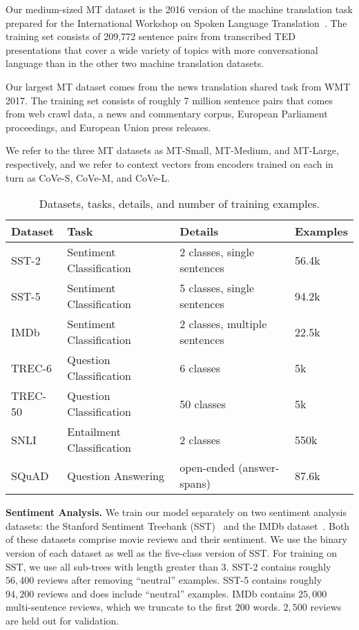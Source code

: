 \documentclass{article}
\begin{document}
Our medium-sized MT dataset is the 2016 version of the machine translation task prepared for the International Workshop on Spoken Language Translation~\citep{cettolo2015iwslt}. 
The training set consists of 209,772 sentence pairs from transcribed TED presentations that cover a wide variety of topics with more conversational language than in the other two machine translation datasets.

Our largest MT dataset comes from the news translation shared task from WMT 2017.
The training set consists of roughly 7 million sentence pairs that comes from web crawl data, a news and commentary corpus, European Parliament proceedings, and European Union press releases.

We refer to the three MT datasets as MT-Small, MT-Medium, and MT-Large, respectively,
and we refer to context vectors from encoders trained on each in turn as CoVe-S, CoVe-M, and CoVe-L.
\bigskip

\begin{table}
  \centering
\begin{tabular}{llll}
    \toprule
Dataset & Task & Details & Examples\\
\midrule
 SST-2   &Sentiment Classification & 2 classes, single sentences        & 56.4k\\
 SST-5   & Sentiment Classification & 5 classes, single sentences           &94.2k \\
 IMDb    & Sentiment Classification & 2 classes, multiple sentences          &22.5k   \\
TREC-6  & Question Classification& 6 classes & 5k  \\
  TREC-50 & Question Classification& 50 classes &5k  \\
SNLI    &Entailment Classification &  2 classes        &  550k \\
SQuAD & Question Answering & open-ended (answer-spans)  & 87.6k  \\
\bottomrule
  \end{tabular}
      \caption{Datasets, tasks, details, and number of training examples.}
      \vspace{-0.6cm}
  \label{tasks}
\end{table}

\textbf{Sentiment Analysis.} 
We train our model separately on two sentiment analysis datasets: the Stanford Sentiment Treebank (SST)~\citep{Socher2013EMNLP} and the IMDb dataset~\citep{maas-EtAl:2011:ACL-HLT2011}.
Both of these datasets comprise movie reviews and their sentiment.
We use the binary version of each dataset as well as the five-class version of SST.
For training on SST, we use all sub-trees with length greater than $3$.
SST-2 contains roughly $56,400$ reviews after removing ``neutral'' examples. 
SST-5 contains roughly $94,200$ reviews and does include ``neutral'' examples.
IMDb contains $25,000$ multi-sentence reviews, which we truncate to the first $200$ words. $2,500$ reviews are held out for validation. 
\end{document}
